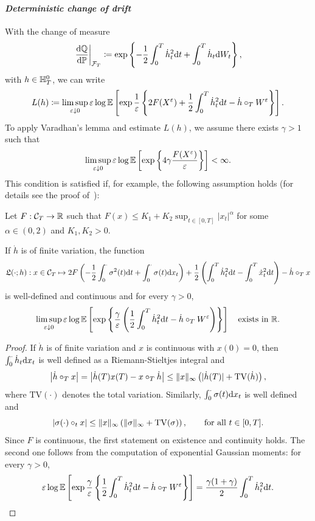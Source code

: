 \paragraph{\textit{Deterministic change of drift}}
With the change of measure
$$
\left. \frac{\mathrm{d}\mathbb{Q}}{\mathrm{d}\mathbb{P}}\right|_{\mathcal{F}_T}
 \coloneqq \exp\left\{-\frac{1}{2}\int_0^T\dot{h}_t^2 \mathrm{d} t  + \int_0^T\dot{h}_t\mathrm{d} W_t \right\},
$$
with $h\in\mathbb{H}_T^0$, we can write
$$
L(h)\coloneqq\limsup\limits_{\varepsilon\downarrow 0} \varepsilon \log\mathbb{E}\left[\exp\frac{1}{\varepsilon}\left\{{2F(X^{\varepsilon}) +\frac{1}{2}\int_0^T\dot{h}_t^2 \mathrm{d} t  - \dot{h}\circ_{T} W^{\varepsilon}}\right\}\right].
$$
To apply Varadhan's lemma and estimate $L(h)$, we assume there exists $\gamma >1$ such that 
\begin{equation}\label{eq:BSAssume}
\limsup\limits_{\varepsilon\downarrow 0} \varepsilon\log\mathbb{E}\left[
\exp\left\{4\gamma \frac{F(X^{\varepsilon})}{\varepsilon}\right\}\right] <\infty.
\end{equation}
This condition is satisfied if, for example, the following assumption holds (for details see the proof of~\cite[Theorem~3.6]{Guasoni2007OptimalTime}):
\begin{assumption}\label{ass:payoffGuassoni}
Let $F:\mathcal{C}_T\rightarrow\mathbb{R}$ such that $F(x)\leq K_{1} + K_{2} \sup_{t\in[0,T]}|x_t|^{\alpha}$ 
for some $\alpha\in (0,2)$ and $K_{1}, K_{2}>0$.
\end{assumption}
\begin{lemma}\label{lem:BSVaradhanCond}
If $\dot{h}$ is of finite variation, the function
\[
\mathfrak{L}(\cdot;h):
x\in \mathcal{C}_T \mapsto 2F\left(-\frac{1}{2}\int_0^\cdot \sigma^2(t)\mathrm{d} t + \int_0^\cdot \sigma(t) \mathrm{d} x_t\right)
 + \frac{1}{2}\left(\int_0^T \dot{h}_t^2\mathrm{d} t-\int_0^T \dot{x}_t^2 \mathrm{d} t\right)
 - \dot{h}\circ_{T} x
\]
is well-defined and continuous and for every $\gamma >0$, 
$$
\limsup\limits_{\varepsilon\downarrow 0} \varepsilon \log\mathbb{E}\left[\exp\left\{\frac{\gamma}{\varepsilon}\left(\frac{1}{2}\int_0^T \dot{h}_t^2\mathrm{d} t
- \dot{h}\circ_{T} W^{\varepsilon}\right)\right\}\right]
\quad
\text{exists in $\mathbb{R}$.}
$$
\end{lemma}
\begin{proof}
If $\dot{h}$ is of finite variation and $x$ is continuous with $x(0)=0$, 
then $\int_0^\cdot\dot{h}_t\mathrm{d} x_t$ is well defined as a Riemann-Stieltjes integral and 
$$
\left|\dot{h}\circ_{T} x\right| = \left|\dot{h}(T)x(T) - x\circ_{T} \dot{h}\right| \leq \|x\|_\infty\left(|\dot{h}(T)| + \mathrm{TV}(\dot{h})\right ),
$$
where $\mathrm{TV}(\cdot)$ denotes the total variation. 
Similarly, $\int_0^\cdot\sigma(t)\mathrm{d} x_t$ is well defined and
$$
\left|\sigma(\cdot)\circ_{t} x\right| \leq \|x\|_\infty\left(\|\sigma\|_\infty + \mathrm{TV}(\sigma)\right),
\qquad\text{for all }t \in [0,T].
$$
Since $F$ is continuous, the first statement on existence and continuity holds.
The second one follows from the computation of exponential Gaussian moments: 
for every $\gamma >0$, 
$$
\varepsilon  \log\mathbb{E}\left[\exp\frac{\gamma}{\varepsilon}\left\{\frac{1}{2}\int_0^T \dot{h}_t^2\mathrm{d} t
- \dot{h}\circ_{T} W^{\varepsilon}\right\}\right]
= \frac{\gamma(1+\gamma)}{2}\int_0^T\dot{h}_t^2\mathrm{d} t.
$$
\end{proof}
